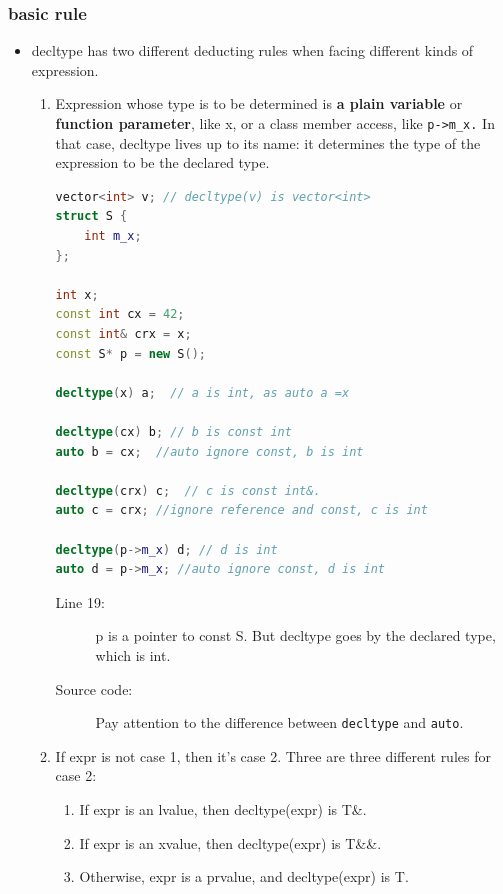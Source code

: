 \documentclass[a4paper,11pt,twoside]{book}
\begin{document}
\subsubsection{basic rule}
\begin{itemize}
	\item decltype has two different deducting rules when facing different kinds of expression.
	
	\begin{enumerate}
		\item Expression whose type is to be determined is \textbf{a plain variable} or \textbf{function parameter}, like x, or a class member access, like \texttt{p->m\_x.} In that case, decltype lives up to its name: it determines the type of the expression to be the declared type.
\begin{lstlisting}[frame=single, language=c++]
vector<int> v; // decltype(v) is vector<int>
struct S {
	int m_x;
};

int x;
const int cx = 42;
const int& crx = x;
const S* p = new S();

decltype(x) a;  // a is int, as auto a =x

decltype(cx) b; // b is const int
auto b = cx;  //auto ignore const, b is int

decltype(crx) c;  // c is const int&.
auto c = crx; //ignore reference and const, c is int

decltype(p->m_x) d; // d is int
auto d = p->m_x; //auto ignore const, d is int
\end{lstlisting}
\begin{description}
	\item[Line 19:] p is a pointer to const S. But decltype goes by the declared type, which is int.
	\item[Source code:] Pay attention to the difference between \texttt{decltype} and \texttt{auto}.
\end{description}
		
		\item If expr is not case 1, then it's case 2. Three are three different rules for case 2:
		\begin{enumerate}
			\item If expr is an lvalue, then decltype(expr) is T\&. 
			\item If expr is an xvalue, then decltype(expr) is T\&\&. 
			\item Otherwise, expr is a prvalue, and decltype(expr) is T.
		\end{enumerate}
	\end{enumerate}


\end{itemize}
\end{document}
